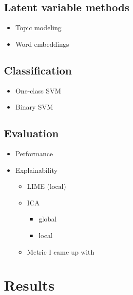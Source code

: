 \documentclass{article}
\begin{document}
\hypertarget{latent-variable-methods}{%
\subsection{Latent variable methods}\label{latent-variable-methods}}

\begin{itemize}
\tightlist
\item
  Topic modeling
\item
  Word embeddings
\end{itemize}

\hypertarget{classification}{%
\subsection{Classification}\label{classification}}

\begin{itemize}
\tightlist
\item
  One-class SVM
\item
  Binary SVM
\end{itemize}

\hypertarget{evaluation}{%
\subsection{Evaluation}\label{evaluation}}

\begin{itemize}
\tightlist
\item
  Performance
\item
  Explainability

  \begin{itemize}
  \tightlist
  \item
    LIME (local)
  \item
    ICA

    \begin{itemize}
    \tightlist
    \item
      global
    \item
      local
    \end{itemize}
  \item
    Metric I came up with
  \end{itemize}
\end{itemize}

\hypertarget{results}{%
\section{Results}\label{results}}
\end{document}
